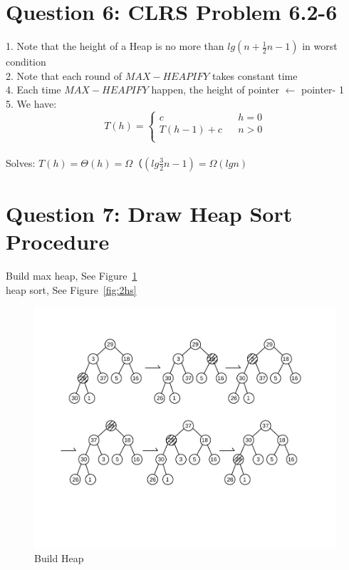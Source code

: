 \documentclass[]{article}
\begin{document}
\section{Question 6: CLRS Problem 6.2-6}

1. Note that the height of a Heap is no more than $lg(n+\frac{1}{2}n - 1)$ in worst condition\\
2. Note that each round of $MAX-HEAPIFY$ takes constant time\\
4. Each time $MAX-HEAPIFY$ happen, the height of pointer $\leftarrow$ pointer- 1\\
5. We have:\\ 
	$$ T(h)=\left\{
	\begin{array}{lcl}
	c       &      & {h = 0}\\
	T(h - 1) + c     &      & {n > 0}\\
	\end{array} \right. $$\\

Solves: $T(h) = \Theta(h) = \Omega（(lg\frac{3}{2}n - 1) = \Omega (lgn)$

\section{Question 7: Draw Heap Sort Procedure}

Build max heap, See Figure~\ref{fig:2bh}\\
heap sort, See Figure~\ref{fig:2hs}

\begin{figure}
	\centering
	\includegraphics[width=0.9\linewidth]{2_build_heap}
	\caption{Build Heap}
	\label{fig:2bh}
\end{figure}
\end{document}
